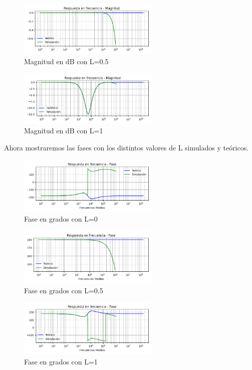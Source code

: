 \begin{figure}[H]
	\centering
	\includegraphics[width=0.6\textwidth]{../Ejercicio4-EcualizadorDeFase/Informe/highFrecL050Mag.png} 
	\caption{Magnitud en dB con L=0.5}
	\label{highMagL05}
\end{figure}

\begin{figure}[H]
	\centering
	\includegraphics[width=0.6\textwidth]{../Ejercicio4-EcualizadorDeFase/Informe/highFrecL100Mag.png} 
	\caption{Magnitud en dB con L=1}
	\label{highMagL10}
\end{figure}


Ahora mostraremos las fases con los distintos valores de L simulados y teóricos.

\begin{figure}[H]
	\centering
	\includegraphics[width=0.6\textwidth]{../Ejercicio4-EcualizadorDeFase/Informe/highFrecL000Fase.png} 
	\caption{Fase en grados con L=0}
	\label{highFaseL00}
\end{figure}
	
\begin{figure}[H]
	\centering
	\includegraphics[width=0.6\textwidth]{../Ejercicio4-EcualizadorDeFase/Informe/highFrecL050Fase.png} 
	\caption{Fase en grados con L=0.5}
	\label{highFaseL05}
\end{figure}

\begin{figure}[H]
	\centering
	\includegraphics[width=0.6\textwidth]{../Ejercicio4-EcualizadorDeFase/Informe/highFrecL100Fase.png} 
	\caption{Fase en grados con L=1}
	\label{highFaseL10}
\end{figure}



